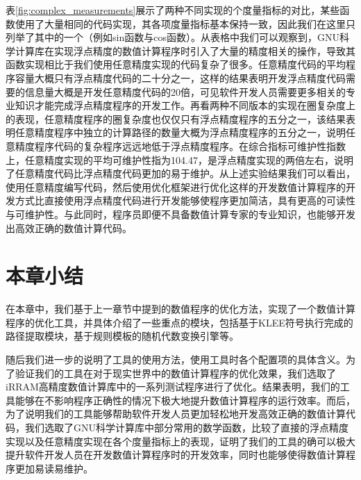 表\ref{fig:complex_measurements}展示了两种不同实现的个度量指标的对比，某些函数使用了大量相同的代码实现，其各项度量指标基本保持一致，因此我们在这里只列举了其中的一个（例如sin函数与cos函数）。从表格中我们可以观察到，GNU科学计算库在实现浮点精度的数值计算程序时引入了大量的精度相关的操作，导致其函数实现相比于我们使用任意精度实现的代码复杂了很多。任意精度代码的平均程序容量大概只有浮点精度代码的二十分之一，这样的结果表明开发浮点精度代码需要的信息量大概是开发任意精度代码的20倍，可见软件开发人员需要更多相关的专业知识才能完成浮点精度程序的开发工作。再看两种不同版本的实现在圈复杂度上的表现，任意精度程序的圈复杂度也仅仅只有浮点精度程序的五分之一，该结果表明任意精度程序中独立的计算路径的数量大概为浮点精度程序的五分之一，说明任意精度程序代码的复杂程序远远地低于浮点精度程序。在综合指标可维护性指数上，任意精度实现的平均可维护性指为104.47，是浮点精度实现的两倍左右，说明了任意精度代码比浮点精度代码更加的易于维护。从上述实验结果我们可以看出，使用任意精度编写代码，然后使用优化框架进行优化这样的开发数值计算程序的开发方式比直接使用浮点精度代码进行开发能够使程序更加简洁，具有更高的可读性与可维护性。与此同时，程序员即便不具备数值计算专家的专业知识，也能够开发出高效正确的数值计算代码。

\section{本章小结}

在本章中，我们基于上一章节中提到的数值程序的优化方法，实现了一个数值计算程序的优化工具，并具体介绍了一些重点的模块，包括基于KLEE符号执行完成的路径提取模块，基于规则模板的随机代数变换引擎等。

随后我们进一步的说明了工具的使用方法，使用工具时各个配置项的具体含义。为了验证我们的工具在对于现实世界中的数值计算程序的优化效果，我们选取了iRRAM高精度数值计算库中的一系列测试程序进行了优化。结果表明，我们的工具能够在不影响程序正确性的情况下极大地提升数值计算程序的运行效率。而后，为了说明我们的工具能够帮助软件开发人员更加轻松地开发高效正确的数值计算代码，我们选取了GNU科学计算库中部分常用的数学函数，比较了直接的浮点精度实现以及任意精度实现在各个度量指标上的表现，证明了我们的工具的确可以极大提升软件开发人员在开发数值计算程序时的开发效率，同时也能够使得数值计算程序更加易读易维护。